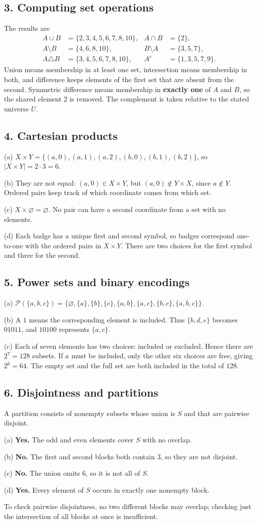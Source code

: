 \documentclass[11pt,letterpaper]{article}
\newcommand{\answer}[2]{\Needspace{2in}\subsection*{#1}#2}
\begin{document}
\answer{3. Computing set operations}{The results are
\begin{align*}
A\cup B&=\{2,3,4,5,6,7,8,10\},& A\cap B&=\{2\},\\
A\setminus B&=\{4,6,8,10\},& B\setminus A&=\{3,5,7\},\\
A\triangle B&=\{3,4,5,6,7,8,10\},& A^c&=\{1,3,5,7,9\}.
\end{align*}
Union means membership in at least one set, intersection means membership in both, and difference keeps elements of the first set that are absent from the second. Symmetric difference means membership in \textbf{exactly one} of $A$ and $B$, so the shared element $2$ is removed. The complement is taken relative to the stated universe $U$.}

\answer{4. Cartesian products}{(a) $X\times Y=\{(a,0),(a,1),(a,2),(b,0),(b,1),(b,2)\}$, so $|X\times Y|=2\cdot3=6$.

(b) They are not equal: $(a,0)\in X\times Y$, but $(a,0)\notin Y\times X$, since $a\notin Y$. Ordered pairs keep track of which coordinate comes from which set.

(c) $X\times\varnothing=\varnothing$. No pair can have a second coordinate from a set with no elements.

(d) Each badge has a unique first and second symbol, so badges correspond one-to-one with the ordered pairs in $X\times Y$. There are two choices for the first symbol and three for the second.}

\answer{5. Power sets and binary encodings}{(a) $\mathcal P(\{a,b,c\})=\{\varnothing,\{a\},\{b\},\{c\},\{a,b\},\{a,c\},\{b,c\},\{a,b,c\}\}$.

(b) A $1$ means the corresponding element is included. Thus $\{b,d,e\}$ becomes $01011$, and $10100$ represents $\{a,c\}$.

(c) Each of seven elements has two choices: included or excluded. Hence there are $2^7=128$ subsets. If $a$ must be included, only the other six choices are free, giving $2^6=64$. The empty set and the full set are both included in the total of $128$.}

\answer{6. Disjointness and partitions}{A partition consists of nonempty subsets whose union is $S$ and that are pairwise disjoint.

(a) \textbf{Yes.} The odd and even elements cover $S$ with no overlap.

(b) \textbf{No.} The first and second blocks both contain $3$, so they are not disjoint.

(c) \textbf{No.} The union omits $6$, so it is not all of $S$.

(d) \textbf{Yes.} Every element of $S$ occurs in exactly one nonempty block.

To check pairwise disjointness, no two different blocks may overlap; checking just the intersection of all blocks at once is insufficient.}
\end{document}
